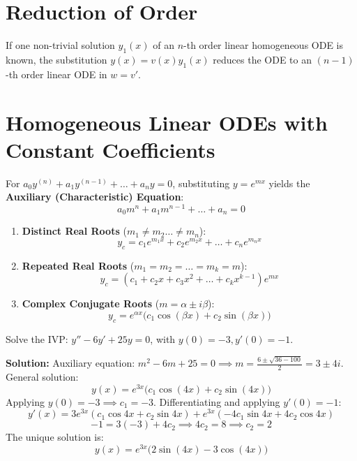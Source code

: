 \documentclass[11pt, a4paper, openany, oneside]{book}
\begin{document}
\section{Reduction of Order}

If one non-trivial solution $y_1(x)$ of an $n$-th order linear homogeneous ODE is known, the substitution $y(x) = v(x) y_1(x)$ reduces the ODE to an $(n-1)$-th order linear ODE in $w = v'$.

\section{Homogeneous Linear ODEs with Constant Coefficients}

For $a_0 y^{(n)} + a_1 y^{(n-1)} + \dots + a_n y = 0$, substituting $y = e^{m x}$ yields the \textbf{Auxiliary (Characteristic) Equation}:
\begin{equation}
    a_0 m^n + a_1 m^{n-1} + \dots + a_n = 0
\end{equation}

\begin{summarybox}
\begin{enumerate}[leftmargin=0.6cm]
\item \textbf{Distinct Real Roots} ($m_1 \neq m_2 \dots \neq m_n$):
    \[ y_c = c_1 e^{m_1 x} + c_2 e^{m_2 x} + \dots + c_n e^{m_n x} \]
\item \textbf{Repeated Real Roots} ($m_1 = m_2 = \dots = m_k = m$):
    \[ y_c = (c_1 + c_2 x + c_3 x^2 + \dots + c_k x^{k-1}) e^{m x} \]
\item \textbf{Complex Conjugate Roots} ($m = \alpha \pm i \beta$):
    \[ y_c = e^{\alpha x} \Big( c_1 \cos(\beta x) + c_2 \sin(\beta x) \Big) \]
\end{enumerate}
\end{summarybox}

\begin{examplebox}
Solve the IVP: $y'' - 6y' + 25y = 0$, with $y(0) = -3, y'(0) = -1$.

\textbf{Solution:}
Auxiliary equation: $m^2 - 6m + 25 = 0 \implies m = \frac{6 \pm \sqrt{36 - 100}}{2} = 3 \pm 4i$.
General solution:
\[ y(x) = e^{3x} \Big( c_1 \cos(4x) + c_2 \sin(4x) \Big) \]
Applying $y(0) = -3 \implies c_1 = -3$.
Differentiating and applying $y'(0) = -1$:
\[ y'(x) = 3e^{3x}(c_1 \cos 4x + c_2 \sin 4x) + e^{3x}(-4c_1 \sin 4x + 4c_2 \cos 4x) \]
\[ -1 = 3(-3) + 4c_2 \implies 4c_2 = 8 \implies c_2 = 2 \]
The unique solution is:
\begin{equation}
    y(x) = e^{3x} \Big( 2\sin(4x) - 3\cos(4x) \Big)
\end{equation}
\end{examplebox}
\end{document}

